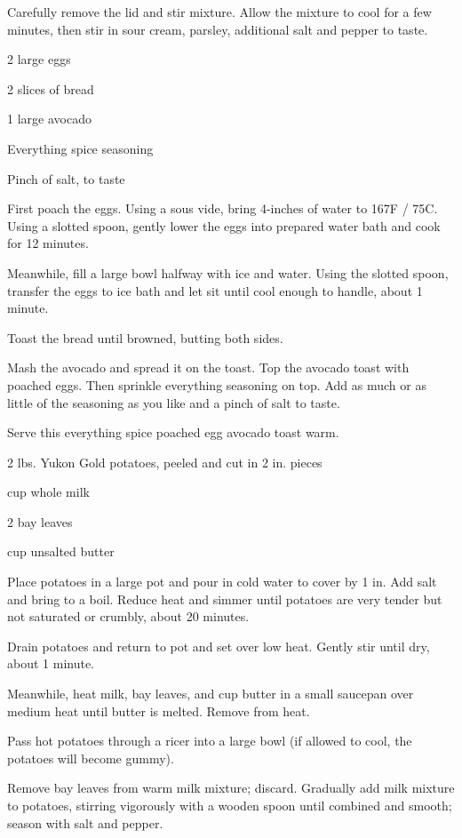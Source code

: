 \documentclass{cookbook}
\begin{document}
Carefully remove the lid and stir mixture. Allow the mixture to cool for a few minutes, then stir in sour cream, parsley, additional salt and pepper to taste.


\begin{ingredients}
    \item 2 large eggs
    \item 2 slices of bread
    \item 1 large avocado
    \item Everything spice seasoning
    \item Pinch of salt, to taste
\end{ingredients}

First poach the eggs. Using a sous vide, bring 4-inches of water to 167\degree F / 75\degree C. Using a slotted spoon, gently lower the eggs into prepared water bath and cook for 12 minutes.

Meanwhile, fill a large bowl halfway with ice and water. Using the slotted spoon, transfer the eggs to ice bath and let sit until cool enough to handle, about 1 minute.

Toast the bread until browned, butting both sides.

Mash the avocado and spread it on the toast. Top the avocado toast with poached eggs. Then sprinkle everything seasoning on top. Add as much or as little of the seasoning as you like and a pinch of salt to taste.

Serve this everything spice poached egg avocado toast warm.


\begin{ingredients}
    \item 2 lbs. Yukon Gold potatoes, peeled and cut in 2 in. pieces
    \item {} cup whole milk
    \item 2 bay leaves
    \item {} cup unsalted butter
\end{ingredients}

Place potatoes in a large pot and pour in cold water to cover by 1 in. Add salt and bring to a boil. Reduce heat and simmer until potatoes are very tender but not saturated or crumbly, about 20 minutes.

Drain potatoes and return to pot and set over low heat. Gently stir until dry, about 1 minute.

Meanwhile, heat milk, bay leaves, and  cup butter in a small saucepan over medium heat until butter is melted. Remove from heat.

Pass hot potatoes through a ricer into a large bowl (if allowed to cool, the potatoes will become gummy).

Remove bay leaves from warm milk mixture; discard. Gradually add milk mixture to potatoes, stirring vigorously with a wooden spoon until combined and smooth; season with salt and pepper.
\end{document}
